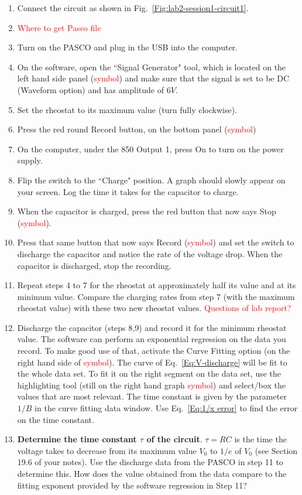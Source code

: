 \documentclass[12pt]{report}
\def \todo #1{\textcolor{red}{#1}}
\begin{document}
\begin{enumerate}
\item Connect the circuit as shown in Fig.~\ref{Fig:lab2-session1-circuit1}.
\item \todo{Where to get Pasco file}
\item Turn on the PASCO and plug in the USB into the computer.
\item On the software, open the ``Signal Generator" tool, which is located on the left hand side panel (\todo{symbol}) and make sure that the signal is set to be DC (Waveform option) and has amplitude of $6V$.
\item Set the rheostat to its maximum value (turn fully clockwise).
\item Press the red round Record button, on the bottom panel (\todo{symbol}) 
\item On the computer, under the 850 Output 1, press On to turn on the power supply.
\item Flip the switch to the ``Charge" position. A graph should slowly appear on your screen. Log the time it takes for the capacitor to charge.
\item When the capacitor is charged, press the red button that now says Stop (\todo{symbol}).
\item Press that same button that now says Record (\todo{symbol}) and set the switch to discharge the capacitor and notice the rate of the voltage drop. When the capacitor is discharged, stop the recording.
\item Repeat steps 4 to 7 for the rheostat at approximately half its value and at its minimum value. Compare the charging rates from step 7 (with the maximum rheostat value) with these two new rheostat values. \todo{Questions of lab report?}
\item Discharge the capacitor (steps 8,9) and record it for the minimum rheostat value. The software can perform an exponential regression on the data you record. To make good use of that, activate the Curve Fitting option (on the right hand side of \todo{symbol}). The curve of Eq.~\ref{Eq:V-discharge} will be fit to the whole data set. To fit it on the right segment on the data set, use the highlighting tool (still on the right hand graph \todo{symbol}) and select/box the values that are most relevant. The time constant is given by the parameter $1/B$ in the curve fitting data window. Use Eq.~\ref{Eq:1/x error} to find the error on the time constant.
\item \textbf{Determine the time constant $\tau$ of the circuit}. $\tau = RC$ is the time the voltage takes to decrease from its maximum value $V_0$ to $1/e$ of $V_0$ (see Section 19.6 of your notes). Use the discharge data from the PASCO in step 11 to determine this. How does the value obtained from the data compare to the fitting exponent provided by the software regression in Step 11?

\end{enumerate}
\end{document}
